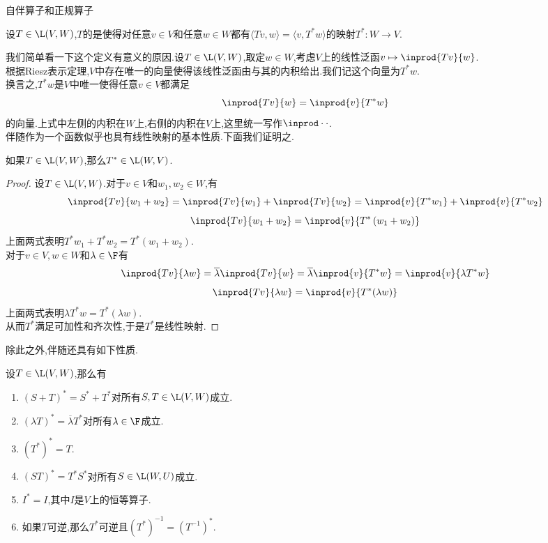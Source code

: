 \documentclass{ctexart}
\begin{document}
\pagestyle{empty}
\begin{center}\large 自伴算子和正规算子\end{center}
\begin{definition}[1.1 定义:伴随]
    设$T\in\L(V,W)$,$T$的是使得对任意$v\in V$和任意$w\in W$都有$\langle Tv,w\rangle=\langle v,T^*w\rangle$的映射$T^*:W\to V$.
\end{definition}\noindent
我们简单看一下这个定义有意义的原因.设$T\in\L(V,W)$,取定$w\in W$,考虑$V$上的线性泛函$v\mapsto\inprod{Tv}{w}$.\\
根据Riesz表示定理,$V$中存在唯一的向量使得该线性泛函由与其的内积给出.我们记这个向量为$T^*w$.\\
换言之,$T^*w$是$V$中唯一使得任意$v\in V$都满足
\[\inprod{Tv}{w}=\inprod{v}{T^*w}\]
的向量.上式中左侧的内积在$W$上,右侧的内积在$V$上,这里统一写作$\inprod\cdot\cdot$.\\
伴随作为一个函数似乎也具有线性映射的基本性质.下面我们证明之.
\begin{formal}[1.2 线性映射的伴随也是线性映射]
    如果$T\in\L(V,W)$,那么$T^*\in\L(W,V)$.
\end{formal}
\begin{proof}
    设$T\in\L(V,W)$.对于$v\in V$和$w_1,w_2\in W$,有
    \[\inprod{Tv}{w_1+w_2}=\inprod{Tv}{w_1}+\inprod{Tv}{w_2}=\inprod{v}{T^*w_1}+\inprod{v}{T^*w_2}\]
    \[\inprod{Tv}{w_1+w_2}=\inprod{v}{T^*\left(w_1+w_2\right)}\]
    上面两式表明$T^*w_1+T^*w_2=T^*\left(w_1+w_2\right)$.\\
    对于$v\in V,w\in W$和$\lambda\in\F$有
    \[\inprod{Tv}{\lambda w}=\overline{\lambda}\inprod{Tv}{w}=\overline{\lambda}\inprod{v}{T^*w}=\inprod{v}{\lambda T^*w}\]
    \[\inprod{Tv}{\lambda w}=\inprod{v}{T^*(\lambda w)}\]
    上面两式表明$\lambda T^*w=T^*(\lambda w)$.\\
    从而$T^*$满足可加性和齐次性,于是$T^*$是线性映射.
\end{proof}\noindent
除此之外,伴随还具有如下性质.
\begin{formal}[1.3 伴随的性质]
    设$T\in\L(V,W)$,那么有
    \begin{enumerate}[label=\tbf{(\arabic*)}]
        \item $(S+T)^*=S^*+T^*$对所有$S,T\in\L(V,W)$成立.
        \item $(\lambda T)^*=\overline{\lambda}T^*$对所有$\lambda\in\F$成立.
        \item $\left(T^*\right)^*=T$.
        \item $(ST)^*=T^*S^*$对所有$S\in\L(W,U)$成立.
        \item $I^*=I$,其中$I$是$V$上的恒等算子.
        \item 如果$T$可逆,那么$T^*$可逆且$\left(T^*\right)^{-1}=\left(T^{-1}\right)^*$.
    \end{enumerate}
\end{formal}\noindent
\end{document}
